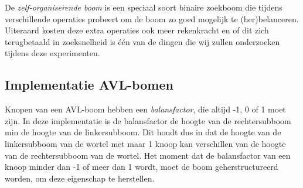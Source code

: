 \documentclass[a4paper,10pt]{article}
\begin{document}
\begin{center}
\end{center}

De \emph{zelf-organiserende boom} is een speciaal soort binaire zoekboom die tijdens verschillende operaties probeert om de boom zo
goed mogelijk te (her)belanceren. Uiteraard kosten deze extra operaties ook meer rekenkracht en of dit zich terugbetaald in zoeksnelheid is \'e\'en van de dingen die wij zullen onderzoeken tijdens deze experimenten.

\subsection{Implementatie AVL-bomen}
Knopen van een AVL-boom hebben een \emph{balansfactor}, die altijd -1, 0 of 1 moet zijn. 
In deze implementatie is de balansfactor de hoogte van de rechtersubboom min de hoogte van de linkersubboom. 
Dit houdt dus in dat de hoogte van de linkersubboom van de wortel met maar 1 knoop kan verschillen van de hoogte van de rechtersubboom van de wortel. 
Het moment dat de balansfactor van een knoop minder dan -1 of meer dan 1 wordt, moet de boom geherstructureerd worden, om deze eigenschap te herstellen. \\
\end{document}
